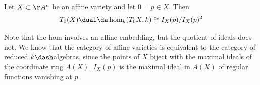 \begin{lemma}[?]

Let \(X \subset\AA^n\) be an affine variety and let \(0 = p\in X\). Then
\begin{align*}
T_0(X)\dual \da \hom_k(T_0X, k) \cong I_X(p) / I_X(p)^2
\end{align*}

\end{lemma}

\begin{remark}

Note that the hom involves an affine embedding, but the quotient of
ideals does not. We know that the category of affine varieties is
equivalent to the category of reduced \(k\dash\)algebras, since the
points of \(X\) biject with the maximal ideals of the coordinate ring
\(A(X)\). \(I_X(p)\) is the maximal ideal in \(A(X)\) of regular
functions vanishing at \(p\).

\end{remark}

